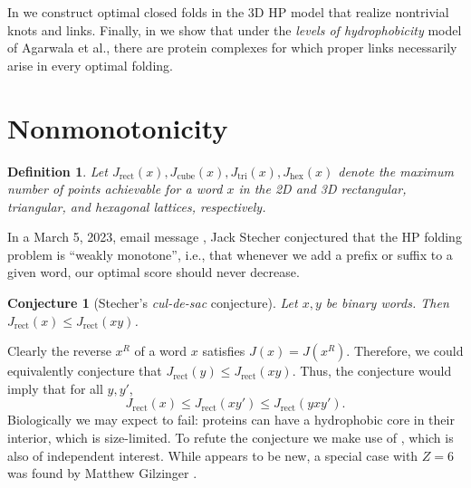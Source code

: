 \documentclass{article}
\newtheorem{definition}[theorem]{Definition}
\newtheorem{conjecture}[theorem]{Conjecture}
\begin{document}
In  we construct optimal closed folds in the 3D HP model that realize nontrivial knots and links. 
Finally, in  we show that under the \emph{levels of hydrophobicity} model of Agarwala et al.,
there are protein complexes for which proper links necessarily arise in every optimal folding.


\section{Nonmonotonicity}\label{sec2}


	\begin{definition}\label{df:J}
		Let $J_{\mathrm{rect}}(x), J_{\mathrm{cube}}(x), J_{\mathrm{tri}}(x), J_{\mathrm{hex}}(x)$ denote the maximum number of points achievable for a word $x$ in the
		2D and 3D rectangular, triangular, and hexagonal lattices, respectively.
	\end{definition}

	In a March 5, 2023, email message \cite{stecher}, Jack Stecher conjectured that the HP folding problem is ``weakly monotone'', i.e.,
	that whenever we add a prefix or suffix to a given word, our optimal score should never decrease.
	\begin{conjecture}[Stecher's \emph{cul-de-sac} conjecture]\label{conj}
		Let $x,y$ be binary words. Then $J_{\mathrm{rect}}(x)\le J_{\mathrm{rect}}(xy)$.
	\end{conjecture}
	Clearly the reverse $x^R$ of a word $x$ satisfies $J(x)=J(x^R)$. Therefore, we could equivalently conjecture that $J_{\mathrm{rect}}(y)\le J_{\mathrm{rect}}(xy)$.
	Thus, the conjecture would imply that for all $y,y'$,
	\begin{equation}\label{referee-last}
		J_{\mathrm{rect}}(x)
		\le J_{\mathrm{rect}}(xy')
		\le J_{\mathrm{rect}}(yxy').
	\end{equation}
	Biologically we may expect  to fail: proteins can have a hydrophobic core in their interior, which is size-limited.
	To refute the conjecture we make use of , which is also of independent interest.
	While  appears to be new, a special case with $Z=6$ was found by Matthew Gilzinger \cite[Figure 13]{Gilzinger2012}.
\end{document}
